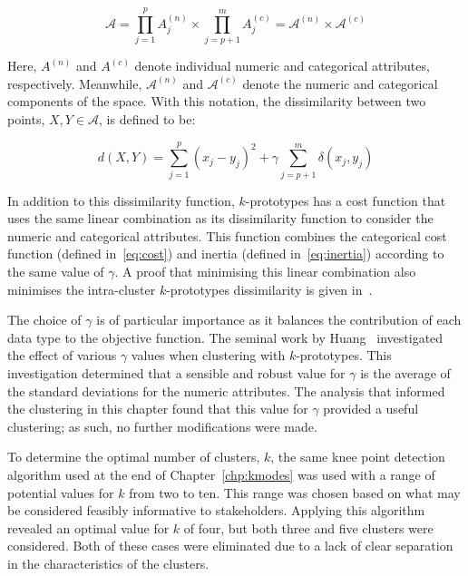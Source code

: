 \begin{equation}
    \mathcal A
    = \prod_{j=1}^{p} A^{(n)}_j \times \prod_{j=p+1}^{m} A^{(c)}_j
    = \mathcal A^{(n)} \times \mathcal A^{(c)}
\end{equation}

Here, \(A^{(n)}\) and \(A^{(c)}\) denote individual numeric and categorical
attributes, respectively. Meanwhile, \(\mathcal A^{(n)}\) and \(\mathcal
A^{(c)}\) denote the numeric and categorical components of the space. With this
notation, the dissimilarity between two points, \(X, Y \in \mathcal A\), is
defined to be:

\begin{equation}\label{eq:kprototypes}
    d(X, Y) = \sum_{j=1}^{p} \left(x_j - y_j\right)^2 + \gamma \sum_{j=p+1}^{m}
    \delta \left(x_j, y_j\right)
\end{equation}



In addition to this dissimilarity function, \(k\)-prototypes has a cost function
that uses the same linear combination as its dissimilarity function to consider
the numeric and categorical attributes. This function combines the categorical
cost function (defined in~\eqref{eq:cost}) and inertia (defined
in~\eqref{eq:inertia}) according to the same value of \(\gamma\). A proof that
minimising this linear combination also minimises the intra-cluster
\(k\)-prototypes dissimilarity is given in~\cite{Huang1997a}.

The choice of \(\gamma\) is of particular importance as it balances the
contribution of each data type to the objective function. The seminal work by
Huang~\cite{Huang1997a} investigated the effect of various \(\gamma\) values
when clustering with \(k\)-prototypes. This investigation determined that a
sensible and robust value for \(\gamma\) is the average of the standard
deviations for the numeric attributes. The analysis that informed the clustering
in this chapter found that this value for \(\gamma\) provided a useful
clustering; as such, no further modifications were made.

To determine the optimal number of clusters, \(k\), the same knee point
detection algorithm used at the end of Chapter~\ref{chp:kmodes} was used with a
range of potential values for \(k\) from two to ten. This range was chosen based
on what may be considered feasibly informative to stakeholders. Applying this
algorithm revealed an optimal value for \(k\) of four, but both three and five
clusters were considered. Both of these cases were eliminated due to a lack of
clear separation in the characteristics of the clusters.

